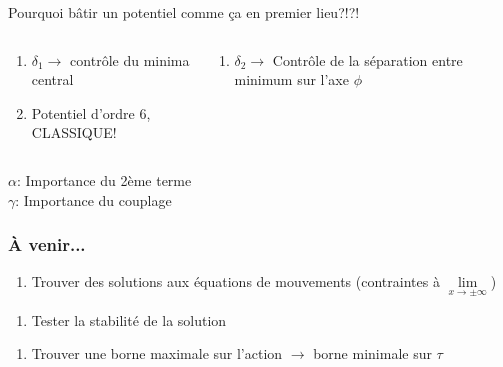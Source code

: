 \documentclass[handout]{beamer}
\begin{document}
\begin{frame}
Pourquoi bâtir un potentiel comme ça en premier lieu?!?!\\
\begin{columns}[T]
    \begin{column}[T]{.5\linewidth}
   \begin{figure}[0.3\textwidth]
    \end{figure}
    \begin{enumerate}
    \item $\delta_1 \rightarrow$ contrôle du minima central
    \item Potentiel d'ordre 6, CLASSIQUE! 
    \end{enumerate}
   
    \end{column}
    \begin{column}[T]{.5\linewidth}
    \begin{figure}[0.3\textwidth]
    \end{figure}
    \begin{enumerate}
    \item    $\delta_2 \rightarrow$ Contrôle de la séparation entre minimum sur l'axe $\phi$
    \end{enumerate}

    \end{column}
  \end{columns}
  
 $\alpha$: Importance du 2ème terme \\
 $\gamma$: Importance du couplage \\
\end{frame}

\begin{frame}\frametitle{À venir...}
\begin{enumerate}
\item Trouver des solutions aux équations de mouvements (contraintes à $\lim\limits_{x \to \pm\infty}$)
\end{enumerate}
\begin{figure}[0.3\textwidth]
    \end{figure}
\begin{enumerate}
    \item Tester la stabilité de la solution
    \end{enumerate} 
    
\begin{figure}[0.3\textwidth]
    \end{figure}
    
\begin{enumerate}
   \item Trouver une borne maximale sur l'action $\rightarrow$ borne minimale sur $\tau$
   \end{enumerate}   
    
\end{frame}
\end{document}
